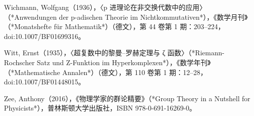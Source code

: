 \begin{itemize}
Wichmann, Wolfgang（1936），〈p 进理论在非交换代数中的应用〉（*Anwendungen der p-adischen Theorie im Nichtkommutativen*），《数学月刊》（*Monatshefte für Mathematik*）（德文），第 44 卷第 1 期：203–224，doi:10.1007/BF01699316。

Witt, Ernst（1935），〈超复数中的黎曼–罗赫定理与 ζ 函数〉（*Riemann-Rochscher Satz und Z-Funktion im Hyperkomplexen*），《数学年刊》（*Mathematische Annalen*）（德文），第 110 卷第 1 期：12–28，doi:10.1007/BF01448015。

Zee, Anthony（2016），《物理学家的群论精要》（*Group Theory in a Nutshell for Physicists*），普林斯顿大学出版社，ISBN 978-0-691-16269-0。

\end{itemize}